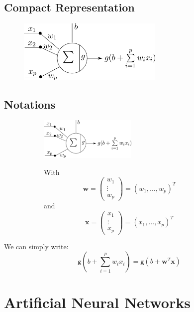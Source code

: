 \documentclass{book}
\newcommand{\x}{\mathbf{x}}
\newcommand{\act}{\texttt{g}}%
\begin{document}
\section{Compact Representation}

\begin{figure}[h]
    \centering
    \includegraphics[height=3cm]{neurone_representation_compacte}
\end{figure}

\section{Notations}

\begin{figure}[h]
    \centering
    \begin{subfigure}{.5\textwidth}
        \includegraphics[height=2cm]{neurone_representation_compacte}
    \end{subfigure}
    \begin{subfigure}{.5\textwidth}
        With
        \[
        \mathbf{w} =
        \begin{pmatrix}
        w_1 \\
        \vdots \\
        w_p
        \end{pmatrix}
        = (w_1, \ldots, w_p)^T
        \]
        and
        \[
        \x =
        \begin{pmatrix}
        x_1 \\
        \vdots \\
        x_p
        \end{pmatrix}
        = (x_1, \ldots, x_p)^T
        \]
    \end{subfigure}
\end{figure}

We can simply write:
\[
\act(b+ \sum\limits_{i=1}^p w_ix_i) = \act(b + \mathbf{w}^T\x)
\]

\chapter{Artificial Neural Networks}
\end{document}
